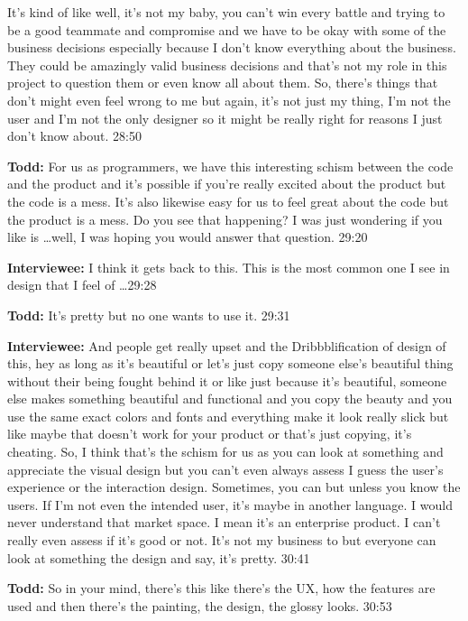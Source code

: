 It's kind of like well, it's not my baby, you can't win every battle and trying to be a good teammate and compromise and we have to be okay with some of the business decisions especially because I don't know everything about the business.  They could be amazingly valid business decisions and that's not my role in this project to question them or even know all about them.  So, there's things that don't might even feel wrong to me but again, it's not just my thing, I'm not the user and I'm not the only designer so it might be really right for reasons I just don't know about.  28:50

\textbf{Todd:} For us as programmers, we have this interesting schism between the code and the product and it's possible if you're really excited about the product but the code is a mess.  It's also likewise easy for us to feel great about the code but the product is a mess.  Do you see that happening?  I was just wondering if you like is \ldots well, I was hoping you would answer that question.  29:20

\textbf{Interviewee:} I think it gets back to this.  This is the most common one I see in design that I feel of \ldots 29:28

\textbf{Todd:} It's pretty but no one wants to use it.  29:31

\textbf{Interviewee:} And people get really upset and the Dribbblification of design of this, hey as long as it's beautiful or let's just copy someone else's beautiful thing without their being fought behind it or like just because it's beautiful, someone else makes something beautiful and functional and you copy the beauty and you use the same exact colors and fonts and everything make it look really slick but like maybe that doesn't work for your product or that's just copying, it's cheating.  So, I think that's the schism for us as you can look at something and appreciate the visual design but you can't even always assess I guess the user's experience or the interaction design.  Sometimes, you can but unless you know the users.  If I'm not even the intended user, it's maybe in another language.  I would never understand that market space.  I mean it's an enterprise product.  I can't really even assess if it's good or not.  It's not my business to but everyone can look at something the design and say, it's pretty.  30:41

\textbf{Todd:} So in your mind, there's this like there's the UX, how the features are used and then there's the painting, the design, the glossy looks.  30:53

